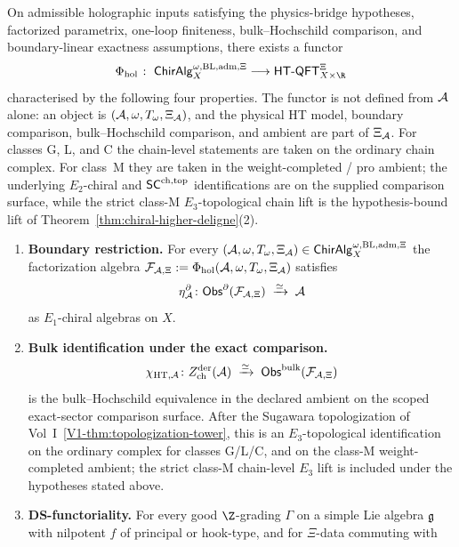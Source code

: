 \begin{theorem}
\label{thm:universal-holography-functor}
On admissible holographic inputs satisfying the physics-bridge
hypotheses, factorized parametrix, one-loop finiteness,
bulk--Hochschild comparison, and boundary-linear exactness
assumptions, there exists a functor
\[
 \Phi_{\mathrm{hol}}
 \;\colon\;
 \ChirAlg^{\omega,\mathrm{BL,adm},\Xi}_X
 \longrightarrow
 \HTQFT^{\Xi}_{X \times \R}
\]
characterised by the following four properties. The functor is not
defined from \(\mathcal{A}\) alone: an object is
\((\mathcal{A},\omega,T_\omega,\Xi_{\mathcal{A}})\), and the physical HT model,
boundary comparison, bulk--Hochschild comparison, and ambient are
part of \(\Xi_{\mathcal{A}}\). For classes G, L, and C the chain-level
statements are taken on the ordinary chain complex. For class~M they
are taken in the weight-completed / pro ambient; the underlying
$E_2$-chiral and $\mathsf{SC}^{\mathrm{ch},\mathrm{top}}$ identifications are
\ClaimStatusProvedHere on the supplied comparison surface, while the
strict class-M $E_3$-topological chain lift is the
hypothesis-bound lift of
Theorem~\ref*{thm:chiral-higher-deligne}(2).
\begin{enumerate}[label=\textup{(\roman*)}]
\item \textbf{Boundary restriction.} For every
 \((\mathcal{A},\omega,T_\omega,\Xi_{\mathcal{A}}) \in
 \mathsf{ChirAlg}^{\omega,\mathrm{BL,adm},\Xi}_X\) the factorization algebra
 \(\mathcal{F}_{\mathcal{A},\Xi}:=\Phi_{\mathrm{hol}}(\mathcal{A},\omega,T_\omega,\Xi_{\mathcal{A}})\)
 satisfies
 \[
 \eta^\partial_{\mathcal{A}}\colon
 \mathsf{Obs}^\partial(\mathcal{F}_{\mathcal{A},\Xi}) \;\xrightarrow{\simeq}\; \mathcal{A}
 \]
 as $E_1$-chiral algebras on $X$.
\item \textbf{Bulk identification under the exact comparison.}
 \[
 \chi_{\mathrm{HT},\mathcal{A}}\colon
 Z^{\mathrm{der}}_{\mathrm{ch}}(\mathcal{A}) \;\xrightarrow{\simeq}\;
 \mathsf{Obs}^{\mathrm{bulk}}(\mathcal{F}_{\mathcal{A},\Xi})
 \]
 is the bulk--Hochschild equivalence in the declared ambient on the
 scoped exact-sector comparison surface. After the Sugawara
 topologization of Vol~I~\ref*{V1-thm:topologization-tower}, this is
	 an $E_3$-topological identification on the ordinary complex for
	 classes G/L/C, and on the class-M weight-completed ambient; the
	 strict class-M chain-level $E_3$ lift is included under the
	 hypotheses stated above.
\item \textbf{DS-functoriality.} For every good $\Z$-grading
 $\Gamma$ on a simple Lie algebra $\mathfrak{g}$ with nilpotent $f$ of
 principal or hook-type, and for \(\Xi\)-data commuting with

\end{enumerate}
\end{theorem}
